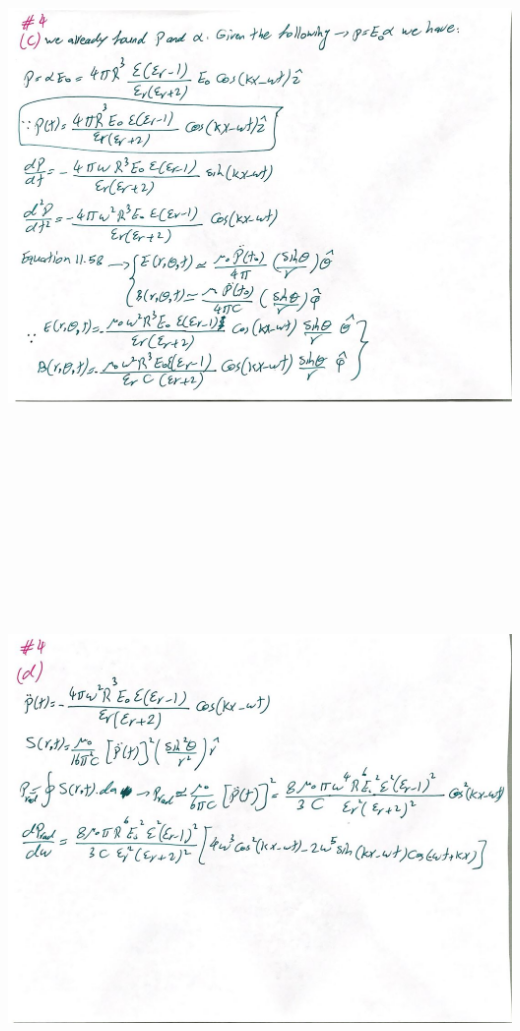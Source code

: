 \documentclass[fleqn]{article}
\begin{document}
\begin{enumerate}
    \pagebreak

    \begin{center}
      \includegraphics[height=16cm, width=17cm]{4B.JPG}
    \end{center}
    
    \pagebreak

    \begin{center} 
      \includegraphics[height=16cm, width=17cm]{4C.JPG}
    \end{center}
    

  \end{enumerate}
\end{document}
